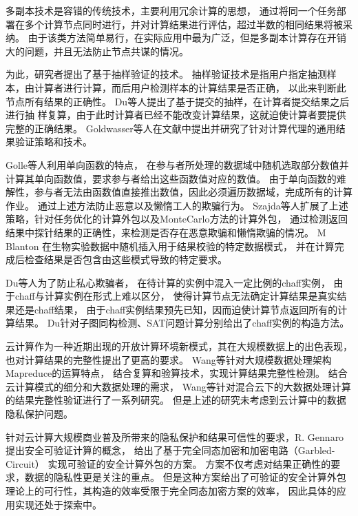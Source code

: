 多副本技术是容错的传统技术，主要利用冗余计算的思想，
通过将同一个任务部署在多个计算节点同时进行，并对计算结果进行评估，超过半数的相同结果将被采纳。
由于该类方法简单易行，在实际应用中最为广泛，但是多副本计算存在开销大的问题，并且无法防止节点共谋的情况。

为此，研究者提出了基于抽样验证的技术。
抽样验证技术是指用户指定抽测样本，由计算者进行计算，而后用户检测样本的计算结果是否正确，
以此来判断此节点所有结果的正确性。
Du等人提出了基于提交的抽样，在计算者提交结果之后进行抽
样复算，由于此时计算者已经不能改变计算结果，这就迫使计算者要提供完整的正确结果。
Goldwasser等人在文献中提出并研究了针对计算代理的通用结果验证策略和技术。

Golle等人利用单向函数的特点，
在参与者所处理的数据域中随机选取部分数值并计算其单向函数值，要求参与者给出这些函数值对应的数值。
由于单向函数的难解性，参与者无法由函数值直接推出数值，因此必须遍历数据域，完成所有的计算作业。
通过上述方法防止恶意以及懒惰工人的欺骗行为。
Szajda等人扩展了上述策略，针对任务优化的计算外包以及MonteCarlo方法的计算外包，
通过检测返回结果中探针结果的正确性，来检测是否存在恶意欺骗和懒惰欺骗的情况。
M Blanton 在生物实验数据中随机插入用于结果校验的特定数据模式，
并在计算完成后检查结果是否包含由这些模式导致的特定要求。

Du等人为了防止私心欺骗者，
在待计算的实例中混入一定比例的chaff实例，
由于chaff与计算实例在形式上难以区分，
使得计算节点无法确定计算结果是真实结果还是chaff结果，
由于chaff实例结果预先已知，因而迫使计算节点返回所有的计算结果。
Du针对子图同构检测、SAT问题计算分别给出了chaff实例的构造方法。

云计算作为一种近期出现的开放计算环境新模式，其在大规模数据上的出色表现，也对计算结果的完整性提出了更高的要求。
Wang等针对大规模数据处理架构Mapreduce的运算特点，
结合复算和验算技术，实现计算结果完整性检测。
结合云计算模式的细分和大数据处理的需求，
Wang等针对混合云下的大数据处理计算的结果完整性验证进行了一系列研究。
但是上述的研究未考虑到云计算中的数据隐私保护问题。

针对云计算大规模商业普及所带来的隐私保护和结果可信性的要求，R. Gennaro提出安全可验证计算的概念，
给出了基于完全同态加密和加密电路（Garbled-Circuit）
实现可验证的安全计算外包的方案。
方案不仅考虑对结果正确性的要求，数据的隐私性更是关注的重点。
但是这种方案给出了可验证的安全计算外包理论上的可行性，其构造的效率受限于完全同态加密方案的效率，
因此具体的应用实现还处于探索中。

